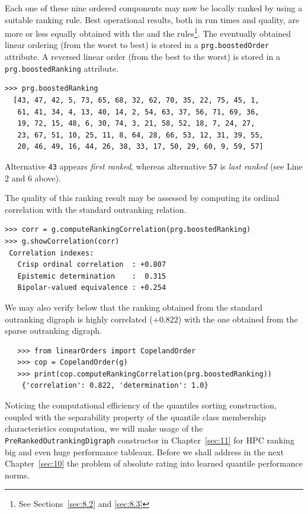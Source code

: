 Each one of these nine ordered components may now be locally ranked by using a suitable ranking rule. Best operational results, both in run times and quality, are more or less equally obtained with the \Copeland and the \NetFlows rules\footnote{See Sections~\vref{sec:8.2} and \vref{sec:8.3}}. The eventually obtained linear ordering (from the worst to best) is stored in a \texttt{prg.boostedOrder} attribute. A reversed linear order (from the best to the worst) is stored in a \texttt{prg.boostedRanking} attribute.
  \begin{lstlisting}
>>> prg.boostedRanking
  [43, 47, 42, 5, 73, 65, 68, 32, 62, 70, 35, 22, 75, 45, 1,
   61, 41, 34, 4, 13, 40, 14, 2, 54, 63, 37, 56, 71, 69, 36,
   19, 72, 15, 48, 6, 30, 74, 3, 21, 58, 52, 18, 7, 24, 27,
   23, 67, 51, 10, 25, 11, 8, 64, 28, 66, 53, 12, 31, 39, 55,
   20, 46, 49, 16, 44, 26, 38, 33, 17, 50, 29, 60, 9, 59, 57]
\end{lstlisting}
Alternative \texttt{43} appears \emph{first ranked}, whereas alternative \texttt{57} is \emph{last ranked} (see Line 2 and 6 above).

The quality of this ranking result may be assessed by computing its ordinal correlation with the standard outranking relation.  
\begin{lstlisting}
>>> corr = g.computeRankingCorrelation(prg.boostedRanking)
>>> g.showCorrelation(corr)
 Correlation indexes:
   Crisp ordinal correlation  : +0.807
   Epistemic determination    :  0.315
   Bipolar-valued equivalence : +0.254
\end{lstlisting}

We may also verify below that the \Copeland ranking obtained from the standard outranking digraph is highly correlated ($+0.822$) with the one obtained from the sparse outranking digraph.
\begin{lstlisting}
   >>> from linearOrders import CopelandOrder
   >>> cop = CopelandOrder(g)
   >>> print(cop.computeRankingCorrelation(prg.boostedRanking))
    {'correlation': 0.822, 'determination': 1.0}
\end{lstlisting}

\vspace{1cm}
Noticing the computational efficiency of the quantiles sorting construction, coupled with the separability property of the quantile class membership characteristics computation, we will make usage of the \texttt{PreRankedOutrankingDigraph} constructor in Chapter~\vref{sec:11} for HPC ranking big and even huge performance tableaux. Before we shall address in the next Chapter~\vref{sec:10} the problem of absolute rating into learned quantile performance norms.

\clearpage


%
 
